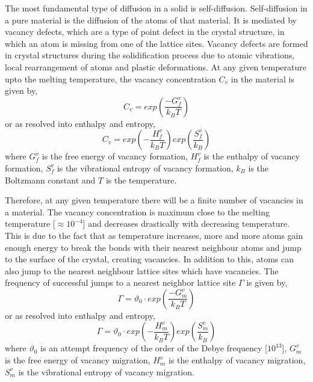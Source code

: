 \documentclass{report}
\begin{document}
The most fundamental type of diffusion in a solid is self-diffusion. Self-diffusion in a pure material is the diffusion of the atoms of that material. It is mediated by vacancy defects, which are a type of point defect in the crystal structure, in which an atom is missing from one of the lattice sites. Vacancy defects are formed in crystal structures during the solidification process due to atomic vibrations, local rearrangement of atoms and plastic deformations. At any given temperature upto the melting temperature, the vacancy concentration $C_v$ in the material is given by,
%
\begin{equation}
C_v = exp\left(\dfrac{-G^v_f}{k_B T}\right)
\end{equation}
%
or as resolved into enthalpy and entropy,
%
\begin{equation}
C_v = exp\left(-\dfrac{H^v_f}{k_B T}\right) exp\left(\dfrac{S^v_f}{k_B}\right)
\end{equation}
%
where $G^v_f$ is the free energy of vacancy formation, $H^v_f$ is the enthalpy of vacancy formation, $S^v_f$ is the vibrational entropy of vacancy formation, $k_B$ is the Boltzmann constant and $T$ is the temperature. 

Therefore, at any given temperature there will be a finite number of vacancies in a material. The vacancy concentration is maximum close to the melting temperature [$\approx10^{-4}$] and decreases drastically with decreasing temperature. This is due to the fact that as temperature increases, more and more atoms gain enough energy to break the bonds with their nearest neighbour atoms and jump to the surface of the crystal, creating vacancies. In addition to this, atoms can also jump to the nearest neighbour lattice sites which have vacancies. The frequency of successful jumps to a nearest neighbor lattice site $\Gamma$ is given by,
%
\begin{equation}
\Gamma = \vartheta_0 \cdot exp\left(\dfrac{-G^v_m}{k_B T}\right)
\end{equation}
%
or as resolved into enthalpy and entropy,
%
\begin{equation}
\Gamma = \vartheta_0 \cdot exp\left(-\dfrac{H^v_m}{k_B T}\right) exp\left(\dfrac{S^v_m}{k_B}\right)
\end{equation}
%
where $\vartheta_0$ is an attempt frequency of the order of the Debye frequency [$10^{13}$],  $G^v_m$ is the free energy of vacancy migration, $H^v_m$ is the enthalpy of vacancy migration, $S^v_m$ is the vibrational entropy of vacancy migration.
\end{document}
